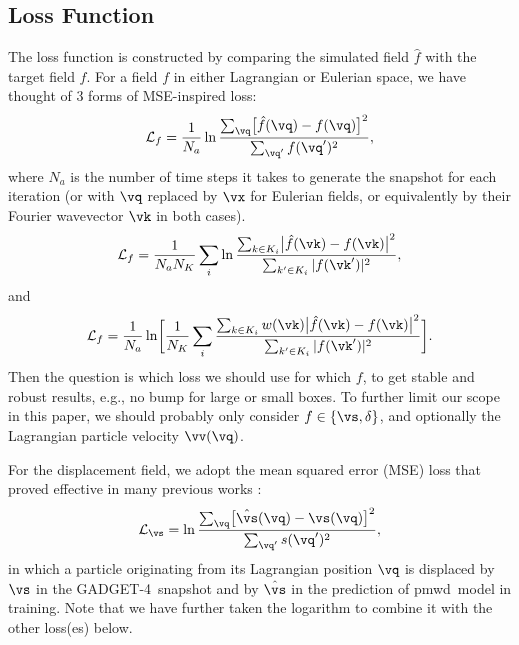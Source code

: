 \documentclass[modern, trackchanges, dvipsnames]{aastex631}
\newcommand{\pmwd}{{\usefont{T1}{nova}{m}{sl}pmwd}}
\newcommand{\GADGET}{{{\fontsize{10pt}{12pt}\selectfont GADGET}-4}}
\newcommand{\cL}{\mathcal{L}}
\newcommand{\YL}[1]{\textcolor{Bittersweet}{#1}}
\begin{document}
\vspace{1em}
\subsection{Loss Function}

The loss function is constructed by comparing the simulated field $\hat f$ with
the target field $f$.
\YL{
For a field $f$ in either Lagrangian or Eulerian space, we have thought
of 3 forms of MSE-inspired loss:
%
\begin{equation}
\cL_f = \frac1{N_a} \ln
  \frac{\sum_\vq \bigl[ \hat f(\vq) - f(\vq) \bigr]^2}
       {\sum_{\vq'} f(\vq')^2},
\end{equation}
%
where $N_a$ is the number of time steps it takes to generate the snapshot for
each iteration
(or with $\vq$ replaced by $\vx$ for Eulerian fields, or equivalently by
their Fourier wavevector $\vk$ in both cases).
%
\begin{equation}
\cL_f = \frac1{N_a N_K} \sum_i \ln
\frac{\sum_{k \in K_i} \bigl| \hat f(\vk) - f(\vk) \bigr|^2}
     {\sum_{k' \in K_i} | f(\vk')|^2},
\end{equation}
%
and
%
\begin{equation}
\cL_f = \frac1{N_a} \ln \biggl[ \frac1{N_K} \sum_i
\frac{\sum_{k \in K_i} w(\vk)
      \bigl| \hat f(\vk) - f(\vk) \bigr|^2}
     {\sum_{k' \in K_i} |f(\vk')|^2} \biggl].
\end{equation}
%
Then the question is which loss we should use for which $f$, to get
stable and robust results, e.g., no bump for large or small boxes.
To further limit our scope in this paper, we should probably only
consider $f \in \{\vs, \delta\}$, and optionally the Lagrangian particle
velocity $\vv(\vq)$.
}

For the displacement field, we adopt the mean squared error (MSE) loss
that proved effective in many previous works
\citep[e.g.,][]{HeEtAl2019, LiEtAl2021}:
%
\begin{equation}
\cL_\vs = \ln \frac{\sum_\vq \bigl[ \hat\vs(\vq) - \vs(\vq) \bigr]^2}
                   {\sum_{\vq'} s(\vq')^2},
\end{equation}
%
in which a particle originating from its Lagrangian position $\vq$ is
displaced by $\vs$ in the \GADGET\ snapshot and by $\hat\vs$ in the
prediction of \pmwd\ model in training.
Note that we have further taken the logarithm to combine it with the
other loss(es) below.
\end{document}
